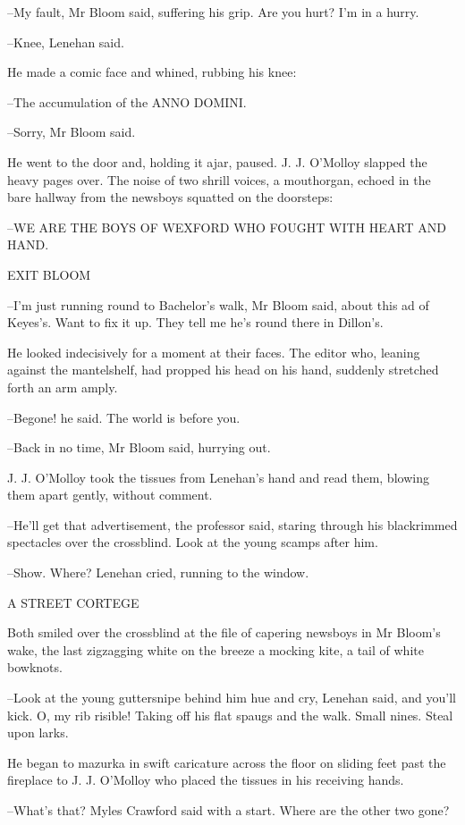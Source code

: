 --My fault, Mr Bloom said, suffering his grip. Are you hurt? I'm in a
hurry.

--Knee, Lenehan said.

He made a comic face and whined, rubbing his knee:

--The accumulation of the ANNO DOMINI.

--Sorry, Mr Bloom said.

He went to the door and, holding it ajar, paused. J. J. O'Molloy
slapped the heavy pages over. The noise of two shrill voices, a
mouthorgan, echoed in the bare hallway from the newsboys squatted on the
doorsteps:


  --WE ARE THE BOYS OF WEXFORD
    WHO FOUGHT WITH HEART AND HAND.


    EXIT BLOOM


--I'm just running round to Bachelor's walk, Mr Bloom said, about this ad
of Keyes's. Want to fix it up. They tell me he's round there in Dillon's.

He looked indecisively for a moment at their faces. The editor who,
leaning against the mantelshelf, had propped his head on his hand,
suddenly stretched forth an arm amply.

--Begone! he said. The world is before you.

--Back in no time, Mr Bloom said, hurrying out.

J. J. O'Molloy took the tissues from Lenehan's hand and read them,
blowing them apart gently, without comment.

--He'll get that advertisement, the professor said, staring through his
blackrimmed spectacles over the crossblind. Look at the young scamps after
him.

--Show. Where? Lenehan cried, running to the window.


    A STREET CORTEGE


Both smiled over the crossblind at the file of capering newsboys in Mr
Bloom's wake, the last zigzagging white on the breeze a mocking kite, a
tail of white bowknots.

--Look at the young guttersnipe behind him hue and cry, Lenehan said, and
you'll kick. O, my rib risible! Taking off his flat spaugs and the walk.
Small nines. Steal upon larks.

He began to mazurka in swift caricature across the floor on sliding
feet past the fireplace to J. J. O'Molloy who placed the tissues in his
receiving hands.

--What's that? Myles Crawford said with a start. Where are the other two
gone?

